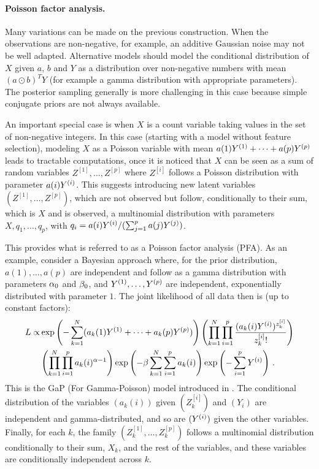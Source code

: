 \paragraph{Poisson factor analysis.}
Many variations can be made on the previous construction. When the observations are non-negative, for example, an additive Gaussian noise may not be well adapted. Alternative models should model the conditional distribution of $X$ given $a$, $b$ and $Y$ as a distribution over non-negative numbers with mean $(a\odot b)^TY$ (for example a gamma distribution with appropriate parameters). The posterior sampling generally is more challenging in this case because simple conjugate priors are not always available.

An important special case is when $X$ is a count variable taking values in the set of non-negative integers. In this case (starting with a model without feature selection), modeling $X$ as a Poisson variable with mean $a(1) Y^{(1)} + \cdots + a(p) Y^{(p)}$ leads to tractable computations, once it is noticed that $X$ can be seen as a sum of random variables $Z^{[1]}, \ldots, Z^{[p]}$ where $Z^{[i]}$ follows a Poisson distribution with parameter $a(i) Y^{(i)}$. This suggests introducing new latent variables $(Z^{[1]}, \ldots, Z^{[p]})$, which are not observed but follow, conditionally to their sum, which is $X$ and is observed, a multinomial distribution with parameters $X, q_1, \ldots, q_p$, with $q_i = a(i) Y^{(i)} /(\sum_{j=1}^p a(j)Y^{(j)})$. 

This provides what is referred to as a Poisson factor analysis (PFA). As an example, consider a Bayesian approach where, for the prior distribution,  $a(1), \ldots, a(p)$ are independent and follow as a gamma distribution with parameters $\alpha_0$ and $\beta_0$,  and $Y^{(1)}, \ldots, Y^{(p)}$ are independent, exponentially distributed with parameter $1$.  The joint likelihood of all  data then is (up to constant factors):
\begin{align*}
L \propto & \exp\left(-\sum_{k=1}^N (a_k(1) Y^{(1)} + \cdots + a_k(p) Y^{(p)})\right) \left(\prod_{k=1}^N \prod_{i=1}^p \frac{(a_k(i) Y^{(i)})^{z_k^{[i]}}}{z^{[i]}_k!}\right)\\
& \left(\prod_{k=1}^N \prod_{i=1}^p a_k(i)^{\alpha-1}\right) \exp\left(-\beta \sum_{k=1}^N\sum_{i=1}^p a_k(i)\right) \exp\left(- \sum_{i=1}^p Y^{(i)}\right) \,.
\end{align*}
This is the GaP (For Gamma-Poisson) model introduced in \citet{canny2004gap}. The conditional distribution of the variables $(a_k(i))$ given $(Z_k^{[i]})$ and $(Y_i)$ are independent and gamma-distributed, and so are $(Y^{(i)})$ given the other variables. Finally, for each $k$, the family $(Z_k^{[1]}, \ldots, Z_k^{[p]})$ follows a multinomial distribution conditionally to their sum, $X_k$, and the rest of the variables, and these variables are conditionally independent across $k$. 


